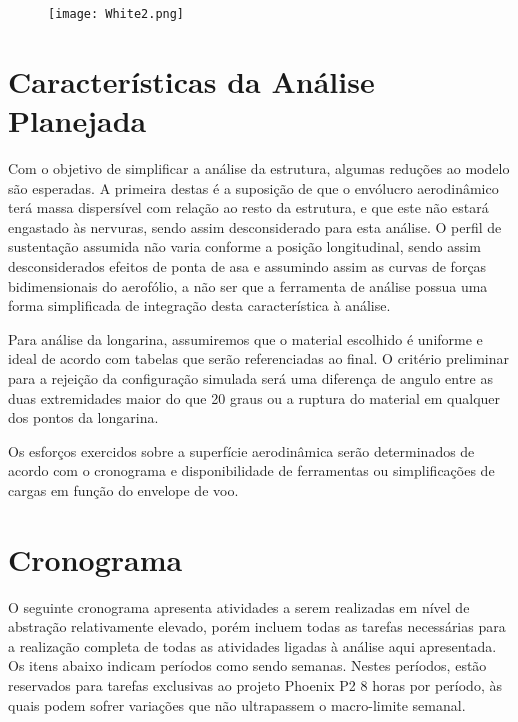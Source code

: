 \documentclass[a4paper]{article}
\begin{document}
\begin{figure}[H]
    \centering
    \texttt{[image: White2.png]}
    \caption{\label{fig:2}}
\end{figure}

\section{Características da Análise Planejada}

Com o objetivo de simplificar a análise da estrutura, algumas reduções ao modelo são esperadas. A primeira destas é a suposição de que o envólucro aerodinâmico terá massa dispersível com relação ao resto da estrutura, e que este não estará engastado às nervuras, sendo assim desconsiderado para esta análise. O perfil de sustentação assumida não varia conforme a posição longitudinal, sendo assim desconsiderados efeitos de ponta de asa e assumindo assim as curvas de forças bidimensionais do aerofólio, a não ser que a ferramenta de análise possua uma forma simplificada de integração desta característica à análise.

Para análise da longarina, assumiremos que o material escolhido é uniforme e ideal de acordo com tabelas que serão referenciadas ao final. O critério preliminar para a rejeição da configuração simulada será uma diferença de angulo entre as duas extremidades maior do que 20 graus ou a ruptura do material em qualquer dos pontos da longarina.

Os esforços exercidos sobre a superfície aerodinâmica serão determinados de acordo com o cronograma e disponibilidade de ferramentas ou simplificações de cargas em função do envelope de voo.

\section{Cronograma}

O seguinte cronograma apresenta atividades a serem realizadas em nível de abstração relativamente elevado, porém incluem todas as tarefas necessárias para a realização completa de todas as atividades ligadas à análise aqui apresentada. Os itens abaixo indicam períodos como sendo semanas. Nestes períodos, estão reservados para tarefas exclusivas ao projeto Phoenix P2 8 horas por período, às quais podem sofrer variações que não ultrapassem o macro-limite semanal.
\end{document}
